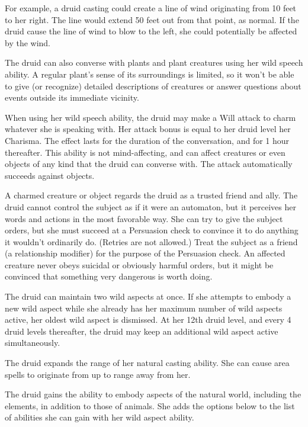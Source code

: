 For example, a druid casting  could create a line of wind originating from 10 feet to her right. The line would extend 50 feet out from that point, as normal. If the druid cause the line of wind to blow to the left, she could potentially be affected by the wind.

 The druid can also converse with plants and plant creatures using her wild speech ability. A regular plant's sense of its surroundings is limited, so it won't be able to give (or recognize) detailed descriptions of creatures or answer questions about events outside its immediate vicinity.

 When using her wild speech ability, the druid may make a Will attack to charm whatever she is speaking with. Her attack bonus is equal to her druid level \add her Charisma. The effect lasts for the duration of the conversation, and for 1 hour thereafter. This ability is not mind-affecting, and can affect creatures or even objects of any kind that the druid can converse with. The attack automatically succeeds against objects.

A charmed creature or object regards the druid as a trusted friend and ally. The druid cannot control the subject as if it were an automaton, but it perceives her words and actions in the most favorable way. She can try to give the subject orders, but she must succeed at a Persuasion check to convince it to do anything it wouldn't ordinarily do. (Retries are not allowed.) Treat the subject as a friend (a  relationship modifier) for the purpose of the Persuasion check. An affected creature never obeys suicidal or obviously harmful orders, but it might be convinced that something very dangerous is worth doing.

 The druid can maintain two wild aspects at once. If she attempts to embody a new wild aspect while she already has her maximum number of wild aspects active, her oldest wild aspect is dismissed. At her 12th druid level, and every 4 druid levels thereafter, the druid may keep an additional wild aspect active simultaneously.

 The druid expands the range of her natural casting ability. She can cause area spells to originate from up to \rngclose range away from her.

 The druid gains the ability to embody aspects of the natural world, including the elements, in addition to those of animals. She adds the options below to the list of abilities she can gain with her wild aspect ability.

